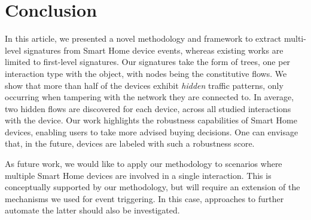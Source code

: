 \section{Conclusion}
\label{sec:conclusion}

In this article,
we presented a novel methodology and framework
to extract multi-level signatures
from Smart Home device events,
whereas existing works are limited to first-level signatures.
Our signatures take the form of trees, one per interaction type with the object,
with nodes being the constitutive flows.
We show that more than half of the devices
exhibit \emph{hidden} traffic patterns,
only occurring when tampering with the network they are connected to. 
In average, two hidden flows are discovered for each device, across all 
studied interactions with the device. 
Our work highlights the robustness capabilities of Smart Home devices,
enabling users to take more advised buying decisions. 
One can envisage that, in the future, devices 
are labeled with such a robustness score.


As future work, we would like to apply our methodology to scenarios where multiple Smart Home devices are involved in a single interaction.  This is conceptually supported by our methodology, but will require an extension of the mechanisms we used for event triggering. In this case, approaches to further automate the latter should also be investigated.

